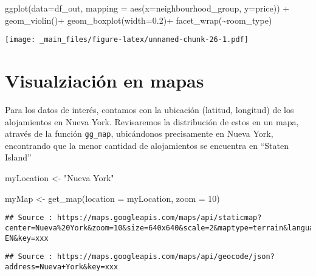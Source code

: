 \documentclass[
]{book}
\newenvironment{Shaded}{\begin{snugshade}}{\end{snugshade}}
\newcommand{\AttributeTok}[1]{\textcolor[rgb]{0.77,0.63,0.00}{#1}}
\newcommand{\DecValTok}[1]{\textcolor[rgb]{0.00,0.00,0.81}{#1}}
\newcommand{\FloatTok}[1]{\textcolor[rgb]{0.00,0.00,0.81}{#1}}
\newcommand{\FunctionTok}[1]{\textcolor[rgb]{0.00,0.00,0.00}{#1}}
\newcommand{\NormalTok}[1]{#1}
\newcommand{\OtherTok}[1]{\textcolor[rgb]{0.56,0.35,0.01}{#1}}
\newcommand{\SpecialCharTok}[1]{\textcolor[rgb]{0.00,0.00,0.00}{#1}}
\newcommand{\StringTok}[1]{\textcolor[rgb]{0.31,0.60,0.02}{#1}}
\begin{document}
\begin{Shaded}
\begin{Highlighting}[]
\FunctionTok{ggplot}\NormalTok{(}\AttributeTok{data=}\NormalTok{df\_out, }\AttributeTok{mapping =} \FunctionTok{aes}\NormalTok{(}\AttributeTok{x=}\NormalTok{neighbourhood\_group, }\AttributeTok{y=}\NormalTok{price)) }\SpecialCharTok{+}
  \FunctionTok{geom\_violin}\NormalTok{()}\SpecialCharTok{+}
  \FunctionTok{geom\_boxplot}\NormalTok{(}\AttributeTok{width=}\FloatTok{0.2}\NormalTok{)}\SpecialCharTok{+}
  \FunctionTok{facet\_wrap}\NormalTok{(}\SpecialCharTok{\textasciitilde{}}\NormalTok{room\_type)}
\end{Highlighting}
\end{Shaded}

\texttt{[image: \_main\_files/figure-latex/unnamed-chunk-26-1.pdf]}

\hypertarget{visualziaciuxf3n-en-mapas}{%
\section*{Visualziación en mapas}\label{visualziaciuxf3n-en-mapas}}

Para los datos de interés, contamos con la ubicación (latitud, longitud) de los alojamientos en Nueva York. Revisaremos la distribución de estos en un mapa, através de la función \texttt{gg\_map}, ubicándonos precisamente en Nueva York, encontrando que la menor cantidad de alojamientos se encuentra en ``Staten Island''

\begin{Shaded}
\begin{Highlighting}[]
\NormalTok{myLocation }\OtherTok{\textless{}{-}} \StringTok{"Nueva York"}

\NormalTok{myMap }\OtherTok{\textless{}{-}} \FunctionTok{get\_map}\NormalTok{(}\AttributeTok{location =}\NormalTok{ myLocation, }\AttributeTok{zoom =} \DecValTok{10}\NormalTok{)}
\end{Highlighting}
\end{Shaded}

\begin{verbatim}
## Source : https://maps.googleapis.com/maps/api/staticmap?center=Nueva%20York&zoom=10&size=640x640&scale=2&maptype=terrain&language=en-EN&key=xxx
\end{verbatim}

\begin{verbatim}
## Source : https://maps.googleapis.com/maps/api/geocode/json?address=Nueva+York&key=xxx
\end{verbatim}
\end{document}
